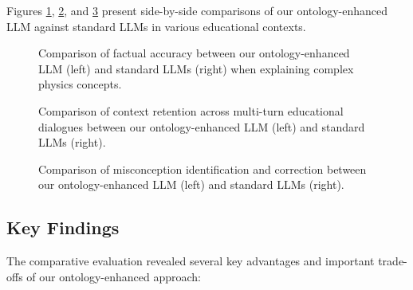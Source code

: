 Figures \ref{fig:comparison-accuracy}, \ref{fig:comparison-context}, and \ref{fig:comparison-misconceptions} present side-by-side comparisons of our ontology-enhanced LLM against standard LLMs in various educational contexts.

\begin{figure}[ht]
    \centering
    \caption{Comparison of factual accuracy between our ontology-enhanced LLM (left) and standard LLMs (right) when explaining complex physics concepts.}
    \label{fig:comparison-accuracy}
\end{figure}

\begin{figure}[ht]
    \centering
    \caption{Comparison of context retention across multi-turn educational dialogues between our ontology-enhanced LLM (left) and standard LLMs (right).}
    \label{fig:comparison-context}
\end{figure}

\begin{figure}[ht]
    \centering
    \caption{Comparison of misconception identification and correction between our ontology-enhanced LLM (left) and standard LLMs (right).}
    \label{fig:comparison-misconceptions}
\end{figure}

\subsection{Key Findings}
\label{subsec:key-findings}

The comparative evaluation revealed several key advantages and important trade-offs of our ontology-enhanced approach:

